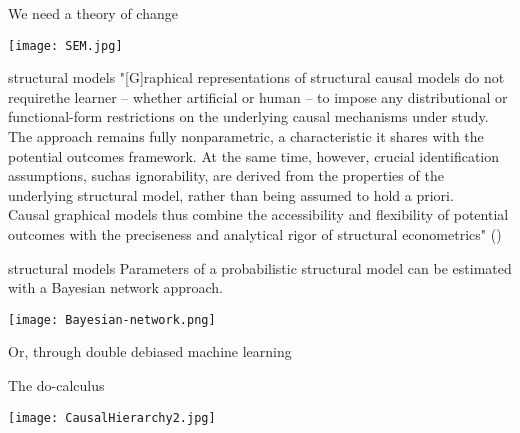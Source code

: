 \documentclass[aspectratio=169]{beamer}
\begin{document}
		\begin{frame}{We need a theory of change}
			\begin{center}
					\texttt{[image: SEM.jpg]}
			\end{center}
		\end{frame}

		\begin{frame}{structural models}
			"[G]raphical representations of structural causal models do not requirethe learner – whether artificial or human – to impose any distributional or functional-form restrictions on the underlying causal mechanisms under study. \\

			The approach remains fully nonparametric, a characteristic it shares with the potential outcomes framework.  At the same time,  however,  crucial identification assumptions,  suchas ignorability, are derived from the properties of the underlying structural model, rather than being assumed to hold a priori.  \\

			Causal graphical models thus combine  the  accessibility  and  flexibility  of  potential  outcomes  with  the  preciseness and  analytical  rigor  of  structural  econometrics" (\cite{Hunermund2021})
		\end{frame}

		\begin{frame}{structural models}
			Parameters of a probabilistic structural model can be estimated with a Bayesian network approach.
			\begin{center}
				\texttt{[image: Bayesian-network.png]}
			\end{center}
			Or, through double debiased machine learning \cite{Chernozhukov2018,Jung2021}
		\end{frame}

		\begin{frame}{The do-calculus}
			\begin{center}
				\texttt{[image: CausalHierarchy2.jpg]}
			\end{center}
		\end{frame}

\end{document}
